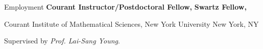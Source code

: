 \begin{rubric}{Employment}
\entry*[2021 -- 2023]%
	\textbf{Courant Instructor/Postdoctoral Fellow,} 
%
%
\entry*[2020 -- 2021]%
	\textbf{Swartz Fellow,} %
	\par Courant Institute of Mathematical Sciences, New York University \hfill New York, NY
	\par Supervised by \textit{Prof. Lai-Sang Young}.
%
\end{rubric}